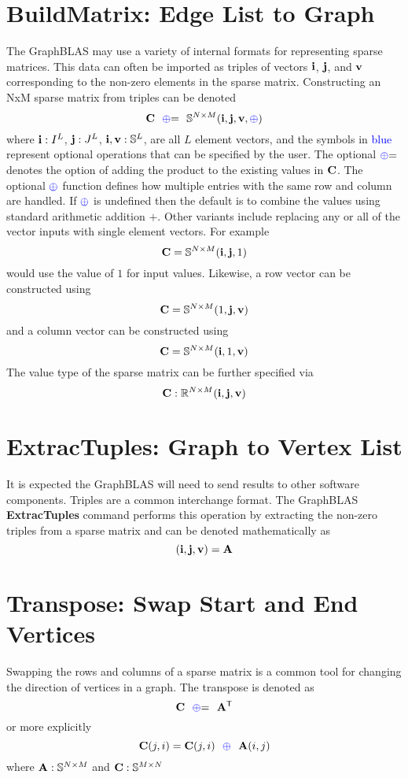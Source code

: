 \section{BuildMatrix: Edge List to Graph}
  The GraphBLAS may use a variety of internal formats for representing sparse matrices.  This data can often be imported as triples of vectors ${\bf i}$, ${\bf j}$, and ${\bf v}$ corresponding to the non-zero elements in the sparse matrix.  Constructing an NxM sparse matrix from triples can be denoted
$$
   \mathbf{C}  ~~ {\textcolor{blue}{\oplus}}{=} ~~  \mathbb{S}^{N \times M}({\bf i},{\bf j},{\bf v},{\textcolor{blue}{\oplus}})
$$
where ${\bf i} : I^L$, ${\bf j}: J^L$, ${\bf i}, {\bf v}: \mathbb{S}^L$, are all $L$ element vectors, and the symbols in \textcolor{blue}{blue} represent optional operations that can be specified by the user.  The optional ${\textcolor{blue}{\oplus}}{=}$ denotes the option of adding the product to the existing values in ${\bf C}$.  The optional  ${\textcolor{blue}{\oplus}}$ function defines how multiple entries with the same row and column are handled.  If ${\textcolor{blue}{\oplus}}$ is undefined then the default is to combine the values using standard arithmetic addition $+$.  Other variants include replacing any or all of the vector inputs with single element vectors.  For example
$$
   \mathbf{C} = \mathbb{S}^{N \times M}({\bf i},{\bf j},1)
$$
would use the value of $1$ for input values.  Likewise, a row vector can be constructed using
$$
   \mathbf{C} = \mathbb{S}^{N \times M}(1,{\bf j},{\bf v})
$$
and a column vector can be constructed using
$$
   \mathbf{C} = \mathbb{S}^{N \times M}({\bf i},1,{\bf v})
$$
The value type of the sparse matrix can be further specified via
$$
   \mathbf{C}: \mathbb{R}^{N \times M}({\bf i},{\bf j},{\bf v})
$$

\section{ExtracTuples: Graph to Vertex List}
  It is expected the GraphBLAS will need to send results to other software components.  Triples are a common interchange format.  The GraphBLAS {\bf ExtracTuples} command performs this operation by extracting the non-zero triples from a sparse matrix and can be denoted mathematically as
$$
	({\bf i},{\bf j},{\bf v}) = {\bf A}
$$

\section{Transpose: Swap Start and End Vertices}
  Swapping the rows and columns of a sparse matrix is a common tool for changing the direction of vertices in a graph.  The transpose is denoted as
$$
     {\bf C} ~~ {\textcolor{blue}{\oplus}}{=} ~~ {\bf A}^{\sf T}
$$   
or more explicitly
$$
     {\bf C}(j,i) = {\bf C}(j,i) ~~ {\textcolor{blue}{\oplus}} ~~ {\bf A}(i,j)
$$   
where ${\bf A}:\mathbb{S}^{N \times M}$ and ${\bf C}:\mathbb{S}^{M \times N}$

